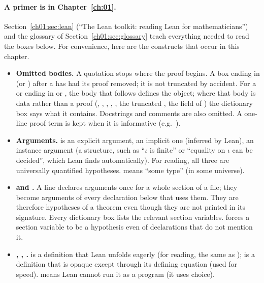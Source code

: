 \paragraph{A primer is in Chapter~\ref{ch:01}.} Section~\ref{ch01:sec:lean} (``The Lean toolkit: reading Lean for
mathematicians'') and the glossary of Section~\ref{ch01:sec:glossary} teach everything needed to read the boxes below. For
convenience, here are the constructs that occur in this chapter.
\begin{itemize}
\item \textbf{Omitted bodies.} A quotation stops where the proof begins. A box ending in  (or \lean{:=}) after a
   has had its proof removed; it is not truncated by accident. For a  or  ending in
   or \lean{:=}, the body that follows defines the object; where that body is data rather than a proof
  (, , , , , the truncated ,
  the  field of ) the dictionary box says what it contains. Docstrings and comments are also
  omitted. A one-line proof term is kept when it is informative (e.g.\ ).
\item \textbf{Arguments.}  is an explicit argument,  an implicit one (inferred by Lean), \lean{[C X]}
  an instance argument (a structure, such as \lean{[Fintype ι]} ``$\iota$ is finite'' or \lean{[DecidableEq ι]} ``equality on $\iota$
  can be decided'', which Lean finds automatically). For reading, all three are universally quantified hypotheses.
   means ``some type'' (in some universe).
\item \textbf{ and .} A  line declares arguments once for a whole section of a
  file; they become arguments of every declaration below that uses them. They are therefore hypotheses of a theorem even
  though they are not printed in its signature. Every dictionary box lists the relevant section variables. 
  forces a section variable  to be a hypothesis even of declarations that do not mention it.
\item \textbf{, , .}  is a definition that Lean unfolds
  eagerly (for reading, the same as );  is a definition that is opaque except through its
  defining equation (used for speed).  means Lean cannot run it as a program (it uses choice).

\end{itemize}
